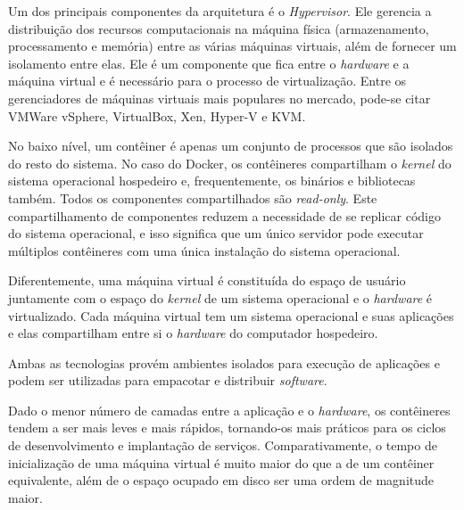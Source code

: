 \documentclass[]{politex}
\begin{document}
	Um dos principais componentes da arquitetura é o \textit{Hypervisor}. Ele gerencia a distribuição dos recursos computacionais na máquina física (armazenamento, processamento e memória) entre as várias máquinas virtuais, além de fornecer um isolamento entre elas. Ele é um componente que fica entre o \textit{hardware} e a máquina virtual e é necessário para o processo de virtualização.
	Entre os gerenciadores de máquinas virtuais mais populares no mercado, pode-se citar VMWare vSphere, VirtualBox, Xen, Hyper-V e KVM.

	No baixo nível, um contêiner é apenas um conjunto de processos que são isolados do resto do sistema. No caso do Docker, os contêineres compartilham o \textit{kernel} do sistema operacional hospedeiro e, frequentemente, os binários e bibliotecas também. Todos os componentes compartilhados são \textit{read-only}. Este compartilhamento de componentes reduzem a necessidade de se replicar código do sistema operacional, e isso significa que um único servidor pode executar múltiplos contêineres com uma única instalação do sistema operacional.

	Diferentemente, uma máquina virtual é constituída do espaço de usuário juntamente com o espaço do \textit{kernel} de um sistema operacional e o \textit{hardware} é virtualizado. Cada máquina virtual tem um sistema operacional e suas aplicações e elas compartilham entre si o \textit{hardware} do computador hospedeiro.

	Ambas as tecnologias provém ambientes isolados para execução de aplicações e podem ser utilizadas para empacotar e distribuir \textit{software}.

	Dado o menor número de camadas entre a aplicação e o \textit{hardware},  os contêineres tendem a ser mais leves e mais rápidos, tornando-os mais práticos para os ciclos de desenvolvimento e implantação de serviços. Comparativamente, o tempo de inicialização de uma máquina virtual é muito maior do que a de um contêiner equivalente, além de o espaço ocupado em disco ser uma ordem de magnitude maior. \cite{whatsthediffvmvscontainers}
	
\end{document}
